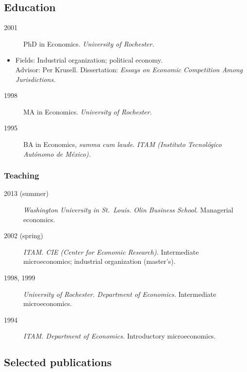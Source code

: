 \documentclass[10pt,]{article}
\def\tightlist{}
\begin{document}
\hypertarget{education}{%
\subsection{Education}\label{education}}

\begin{description}
\tightlist
\item[2001]
PhD in Economics. \emph{University of Rochester.}
\end{description}

\begin{itemize}
\tightlist
\item
  Fields: Industrial organization; political economy.\\
  Advisor: Per Krusell. Dissertation: \emph{Essays on Economic
  Competition Among Jurisdictions.}
\end{itemize}

\begin{description}
\tightlist
\item[1998]
MA in Economics. \emph{University of Rochester.}
\item[1995]
BA in Economics, \emph{summa cum laude}. \emph{ITAM (Instituto
Tecnológico Autónomo de México).}
\end{description}

\hypertarget{teaching}{%
\subsubsection{Teaching}\label{teaching}}

\begin{description}
\tightlist
\item[2013 (summer)]
\emph{Washington University in St.~Louis. Olin Business School.}
Managerial economics.
\item[2002 (spring)]
\emph{ITAM. CIE (Center for Economic Research).} Intermediate
microeconomics; industrial organization (master's).
\item[1998, 1999]
\emph{University of Rochester. Department of Economics.} Intermediate
microeconomics.
\item[1994]
\emph{ITAM. Department of Economics.} Introductory microeconomics.
\end{description}

\hypertarget{selected-publications}{%
\subsection{Selected publications}\label{selected-publications}}
\end{document}
